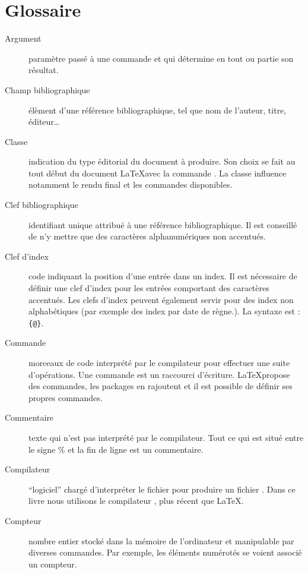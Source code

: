 \chapter{Glossaire}


\begin{description}
\item[Argument] paramètre passé à une commande et qui détermine en tout ou partie son résultat.


\item[Champ bibliographique] élèment d'une référence bibliographique, tel que nom de l'auteur, titre, éditeur…


\item[Classe] indication du type éditorial du document à produire. Son choix se fait au tout début du document \LaTeX avec la commande . La classe influence notamment le rendu final et les commandes disponibles.

\item[Clef bibliographique] identifiant unique attribué à une référence bibliographique. Il est conseillé de n'y mettre que des caractères alphanumériques non accentués.

\item[Clef d'index] code indiquant la position d'une entrée dans un index. Il est nécessaire de définir une clef d'index pour les entrées comportant des caractères accentués. Les clefs d'index peuvent également servir pour des index non alphabétiques (par exemple des index par date de règne.). La syntaxe est : \verb|{|\verb|@|\verb|}|.

\item[Commande] morceaux de code  interprété par le compilateur pour effectuer une suite d'opérations. Une commande est un raccourci d'écriture. \LaTeX propose des commandes, les packages en rajoutent et il est possible de définir ses propres commandes.

\item[Commentaire] texte qui n'est pas interprété par le compilateur. Tout ce qui est situé entre le signe \% et la fin de ligne est un commentaire.

\item[Compilateur] \enquote{logiciel} chargé d'interpréter le fichier  pour produire un fichier . Dans ce livre nous utilisons le compilateur \XeLaTeX, plus récent que \LaTeX.

\item[Compteur] nombre entier stocké dans la mémoire de l'ordinateur et manipulable par diverses commandes. Par exemple, les éléments numérotés se voient associé un compteur.



\end{description}
